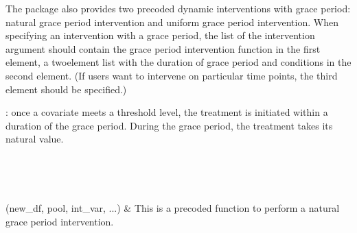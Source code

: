 \documentclass[letterpaper,10pt,english]{sphinxmanual}
\begin{document}
\sphinxAtStartPar
The package also provides two pre\sphinxhyphen{}coded dynamic interventions with grace period: natural grace period intervention
and uniform grace period intervention. When specifying an intervention with a grace period, the list of the intervention
argument should contain the grace period intervention function in the first element, a two\sphinxhyphen{}element list with the
duration of grace period and conditions in the second element. (If users want to intervene on particular
time points, the third element should be specified.)

\sphinxAtStartPar
{}: once a covariate meets a threshold level, the treatment
is initiated within a duration of the grace period. During the grace period, the treatment takes its natural value.

\label{\detokenize{Specifications/Interventions:module-0}}

\begin{savenotes}\sphinxatlongtablestart\begin{longtable}[c]{}
\hline

\endfirsthead

%
{}\\
\hline

\endhead

\hline
{}\\
\endfoot

\endlastfoot

\sphinxAtStartPar
{\hyperref[\detokenize{Specifications/Interventions:pygformula.parametric_gformula.interventions.natural_grace_period}]{}}(new\_df, pool, int\_var, ...)
&
\sphinxAtStartPar
This is a pre\sphinxhyphen{}coded function to perform a natural grace period intervention.
\\
\hline
\end{longtable}\sphinxatlongtableend\end{savenotes}
\end{document}
